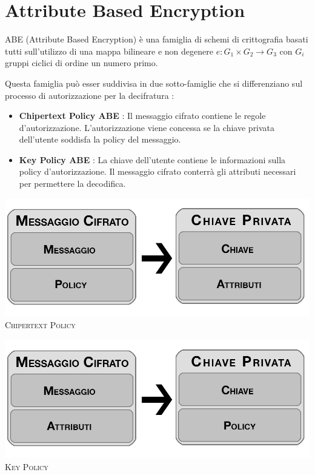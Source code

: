 \chapter{Attribute Based Encryption}

ABE (Attribute Based Encryption) è una famiglia di schemi di crittografia basati tutti sull'utilizzo di una mappa bilineare e non degenere $e:G_1 \times G_2 \rightarrow G_3$ con $G_i$ gruppi ciclici di ordine un numero primo.

Questa famiglia può esser suddivisa in due sotto-famiglie che si differenziano sul processo di autorizzazione per la decifratura :
\begin{itemize}
	\item \textbf{{Chipertext Policy ABE}} :  Il messaggio cifrato contiene le regole d'autorizzazione. L'autorizzazione viene concessa se la chiave privata dell'utente soddisfa la policy del messaggio.
	\item \textbf{Key Policy ABE} : La chiave dell'utente contiene le informazioni sulla policy d'autorizzazione. Il messaggio cifrato conterrà gli attributi necessari per permettere la decodifica.
\end{itemize}

\begin{minipage}[c]{0.9\textwidth}
\vspace{0,3cm}
\centering
	\begin{minipage}[c]{0.45\textwidth}
		\centering
		\includegraphics[keepaspectratio,width=\textwidth]{CT.jpg}\\
		{\small\scshape Chipertext Policy}
	\end{minipage}
	\hfill
	\begin{minipage}[c]{0.45\textwidth}
		\centering
		\includegraphics[keepaspectratio,width=\textwidth]{KP.jpg}\\
		{\small\scshape Key Policy}
	\end{minipage}
\vspace{0,8cm}
\end{minipage}

